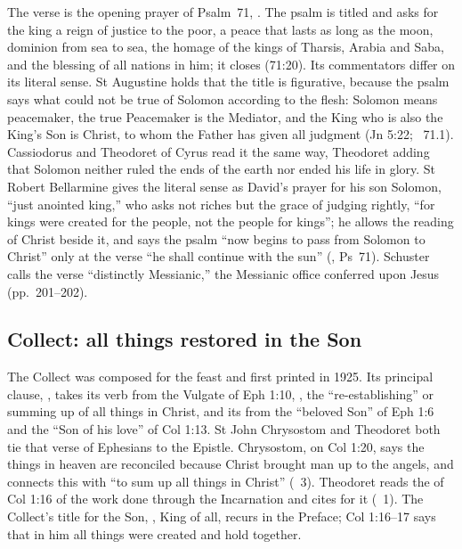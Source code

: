 The verse is the opening prayer of Psalm~71, . The psalm is titled 
and asks for the king a reign of justice to the poor, a peace that lasts as
long as the moon, dominion from sea to sea, the homage of the kings of
Tharsis, Arabia and Saba, and the blessing of all nations in him; it closes
 (71:20). Its commentators differ on
its literal sense. St Augustine holds that the title is figurative, because the
psalm says what could not be true of Solomon according to the flesh: Solomon
means peacemaker, the true Peacemaker is the Mediator, and the King who is
also the King's Son is Christ, to whom the Father has given all judgment (Jn
5:22; \ 71.1). Cassiodorus and Theodoret of Cyrus read it the
same way, Theodoret adding that Solomon neither ruled the ends of the earth nor
ended his life in glory. St Robert Bellarmine gives the literal sense as
David's prayer for his son Solomon, ``just anointed king,'' who asks not riches
but the grace of judging rightly, ``for kings were created for the people, not
the people for kings''; he allows the reading of Christ beside it, and says
the psalm ``now begins to pass from Solomon to Christ'' only at the verse ``he
shall continue with the sun'' (, Ps~71). Schuster calls the
verse ``distinctly Messianic,'' the Messianic office conferred upon Jesus
(pp.~201--202).

\subsection{Collect: all things restored in the Son}
\label{sec:element-collect}

The Collect was composed for the feast and first printed in 1925. Its
principal clause, , takes its verb from the Vulgate of Eph 1:10, , the ``re-establishing'' or summing up of all things in Christ, and
its  from the ``beloved Son'' of Eph 1:6 and the ``Son of
his love'' of Col 1:13. St John Chrysostom and Theodoret both tie that verse
of Ephesians to the Epistle. Chrysostom, on Col 1:20, says the things in heaven
are reconciled because Christ brought man up to the angels, and connects this
with
``to sum up all things in Christ'' (\ 3). Theodoret reads
the  of Col 1:16 of the work done through the Incarnation and
cites  for it (\ 1). The
Collect's title for the Son, , King of all, recurs in
the Preface; Col 1:16--17 says that in him all things were created and hold
together.

